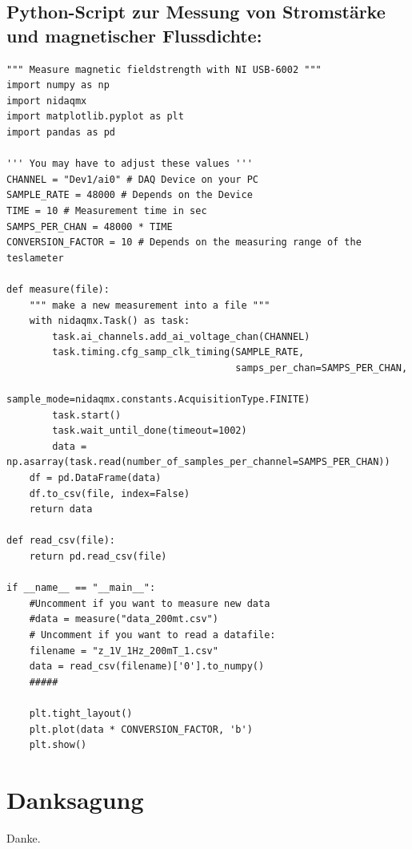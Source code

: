 \documentclass[page,pdftex,12pt,a4paper,twoside,openright]{scrbook}
\begin{document}
\section{Python-Script zur Messung von Stromstärke und magnetischer Flussdichte: \label{anh-messung}}
\label{sec:orgdef197b}
\begin{verbatim}
""" Measure magnetic fieldstrength with NI USB-6002 """
import numpy as np
import nidaqmx
import matplotlib.pyplot as plt
import pandas as pd

''' You may have to adjust these values '''
CHANNEL = "Dev1/ai0" # DAQ Device on your PC
SAMPLE_RATE = 48000 # Depends on the Device
TIME = 10 # Measurement time in sec
SAMPS_PER_CHAN = 48000 * TIME 
CONVERSION_FACTOR = 10 # Depends on the measuring range of the teslameter

def measure(file):
    """ make a new measurement into a file """
    with nidaqmx.Task() as task:
        task.ai_channels.add_ai_voltage_chan(CHANNEL)
        task.timing.cfg_samp_clk_timing(SAMPLE_RATE,
                                        samps_per_chan=SAMPS_PER_CHAN,
                                        sample_mode=nidaqmx.constants.AcquisitionType.FINITE)
        task.start()
        task.wait_until_done(timeout=1002)
        data = np.asarray(task.read(number_of_samples_per_channel=SAMPS_PER_CHAN))
    df = pd.DataFrame(data)
    df.to_csv(file, index=False)
    return data

def read_csv(file):
    return pd.read_csv(file)

if __name__ == "__main__":
    #Uncomment if you want to measure new data
    #data = measure("data_200mt.csv")
    # Uncomment if you want to read a datafile:
    filename = "z_1V_1Hz_200mT_1.csv"
    data = read_csv(filename)['0'].to_numpy()
    #####

    plt.tight_layout()
    plt.plot(data * CONVERSION_FACTOR, 'b')
    plt.show()
\end{verbatim}

\printbibliography

\chapter*{Danksagung}
\label{sec:org24be16e}
Danke.
\end{document}
